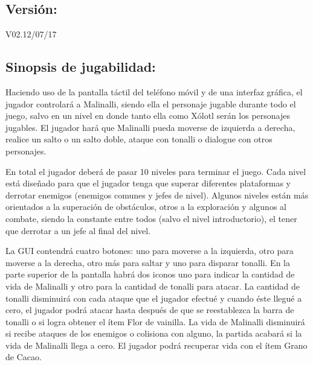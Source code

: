 \documentclass[11pt,letterpaper]{article}
\begin{document}
    	\subsection{Versión:} V02.12/07/17
\subsection{Sinopsis de jugabilidad:}
Haciendo uso de la pantalla táctil del teléfono móvil y de una interfaz gráfica, 
el jugador controlará a Malinalli, siendo ella el personaje jugable durante todo el juego, 
salvo en un nivel en donde tanto ella como Xólotl serán los personajes jugables.
El jugador hará que Malinalli pueda moverse de izquierda a derecha, 
realice un salto o un salto doble, ataque con tonalli o dialogue con otros personajes.

\par
En total el jugador deberá de pasar 10 niveles para terminar el juego. Cada nivel está diseñado para que el jugador tenga que superar diferentes plataformas y derrotar enemigos (enemigos comunes y jefes de nivel). Algunos niveles están más orientados a la superación de obstáculos, otros a la exploración y algunos al combate, siendo la constante entre todos (salvo el nivel introductorio), el tener que derrotar a un jefe al final del nivel.
\\
\par
La GUI contendrá cuatro botones: uno para moverse a la izquierda, otro para moverse a la derecha, otro más para saltar y uno para disparar tonalli. En la parte superior de la pantalla habrá dos iconos uno para indicar la cantidad de vida de Malinalli y otro para la cantidad de tonalli para atacar. La cantidad de tonalli disminuirá con cada ataque que el jugador efectué y cuando éste llegué a cero, el jugador podrá atacar hasta después de que se reestablezca la barra de tonalli o si logra obtener el ítem Flor de vainilla. La vida de Malinalli disminuirá si recibe ataques de los enemigos o colisiona con alguno, la partida acabará si la vida de Malinalli llega a cero. El jugador podrá recuperar vida con el ítem Grano de Cacao.
  		
\end{document}
